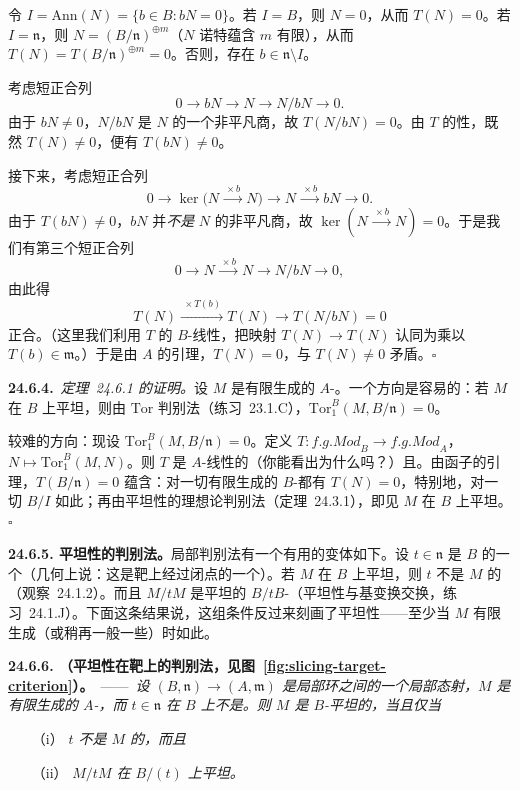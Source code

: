 令 $I=\mathrm{Ann}(N)=\{b\in B: bN=0\}$。若 $I=B$，则 $N=0$，从而 $T(N)=0$。若 $I=\mathfrak{n}$，则 $N=(B/\mathfrak{n})^{\oplus m}$（$N$ 诺特蕴含 $m$ 有限），从而 $T(N)=T(B/\mathfrak{n})^{\oplus m}=0$。否则，存在 $b\in\mathfrak{n}\setminus I$。

考虑短正合列
\[
0 \longrightarrow bN \longrightarrow N \longrightarrow N/bN \longrightarrow 0.
\]
由于 $bN\ne 0$，$N/bN$ 是 $N$ 的一个非平凡商，故 $T(N/bN)=0$。由 $T$ 的\trHalfExact{}性，既然 $T(N)\ne 0$，便有 $T(bN)\ne 0$。

接下来，考虑短正合列
\[
0 \longrightarrow \ker\bigl(N \xrightarrow{\ \times b\ } N\bigr) \longrightarrow N \xrightarrow{\ \times b\ } bN \longrightarrow 0.
\]
由于 $T(bN)\ne 0$，$bN$ 并\emph{不是} $N$ 的非平凡商，故 $\ker(N\xrightarrow{\ \times b\ }N)=0$。于是我们有第三个短正合列
\[
0 \longrightarrow N \xrightarrow{\ \times b\ } N \longrightarrow N/bN \longrightarrow 0,
\]
由此得
\[
T(N) \xrightarrow{\ \times T(b)\ } T(N) \longrightarrow T(N/bN) = 0
\]
正合。（这里我们利用 $T$ 的 $B$-线性，把映射 $T(N)\to T(N)$ 认同为乘以 $T(b)\in\mathfrak{m}$。）于是由 $A$ 的\trNakayama{}引理，$T(N)=0$，与 $T(N)\ne 0$ 矛盾。\hfill$\square$

\textbf{24.6.4.}\ \emph{\mbox{定理~24.6.1} 的证明。}\quad 设 $M$ 是有限生成的 $A$-\trModule。一个方向是容易的：若 $M$ 在 $B$ 上平坦，则由 $\mathrm{Tor}$ 判别法（\mbox{练习~23.1.C}），$\mathrm{Tor}^B_1(M,B/\mathfrak{n})=0$。

较难的方向：现设 $\mathrm{Tor}^B_1(M,B/\mathfrak{n})=0$。定义 $T\colon\mathit{f.g.Mod}_B\to\mathit{f.g.Mod}_A$，$N\mapsto\mathrm{Tor}^B_1(M,N)$。则 $T$ 是 $A$-线性的（你能看出为什么吗？）且\trHalfExact{}。由\trHalfExact{}函子的\trNakayama{}引理，$T(B/\mathfrak{n})=0$ 蕴含：对一切有限生成的 $B$-\trModule{}都有 $T(N)=0$，特别地，对一切 $B/I$ 如此；再由平坦性的理想论判别法（\mbox{定理~24.3.1}），即见 $M$ 在 $B$ 上平坦。\hfill$\square$

\textbf{24.6.5. 平坦性的\trSlicing{}判别法。}\quad 局部判别法有一个有用的变体如下。设 $t\in\mathfrak{n}$ 是 $B$ 的一个\trNonZerodivisor（几何上说：这是靶上经过闭点的一个\trEffectiveCartierDivisor）。若 $M$ 在 $B$ 上平坦，则 $t$ 不是 $M$ 的\trZerodivisor（\mbox{观察~24.1.2}）。而且 $M/tM$ 是平坦的 $B/tB$-\trModule（平坦性与基变换交换，\mbox{练习~24.1.J}）。下面这条结果说，这组条件反过来刻画了平坦性——至少当 $M$ 有限生成（或稍再一般一些）时如此。

\textbf{24.6.6. \trhTheorem（平坦性在靶上的\trSlicing{}判别法，见图~\ref{fig:slicing-target-criterion}）。}\ ——\ \emph{设 $(B,\mathfrak{n})\to(A,\mathfrak{m})$ 是\trNoether{}局部环之间的一个局部态射，$M$ 是有限生成的 $A$-\trModule，而 $t\in\mathfrak{n}$ 在 $B$ 上不是\trZerodivisor。则 $M$ 是 $B$-平坦的，当且仅当}
\begin{itemize}
\item[（i）]\emph{$t$ 不是 $M$ 的\trZerodivisor，而且}
\item[（ii）]\emph{$M/tM$ 在 $B/(t)$ 上平坦。}
\end{itemize}

